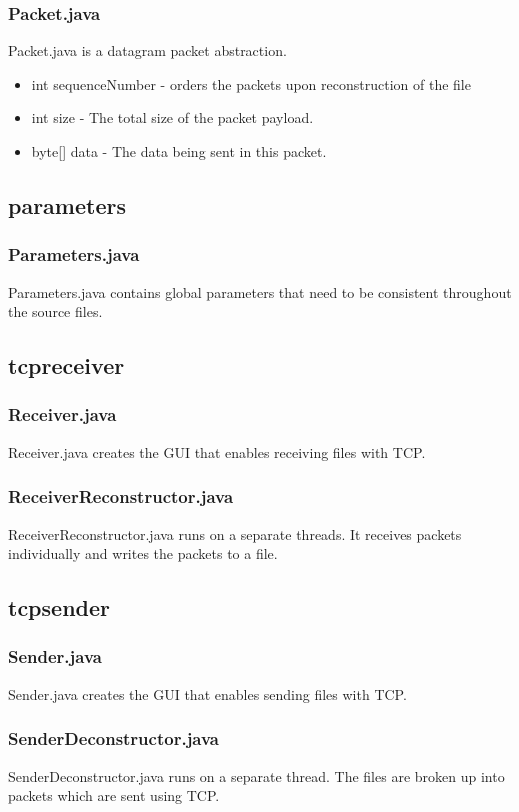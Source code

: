 \documentclass[a4paper,10pt]{article}
\begin{document}
\subsubsection{Packet.java}
Packet.java is a datagram packet abstraction.
\begin{itemize}
	\item int sequenceNumber - orders the packets upon reconstruction of
		the file
	\item int size - The total size of the packet payload.
	\item byte[] data - The data being sent in this packet.
\end{itemize}

\subsection{parameters}
\subsubsection{Parameters.java}
Parameters.java contains global parameters that need to be consistent
throughout the source files.

\subsection{tcpreceiver}
\subsubsection{Receiver.java}
Receiver.java creates the GUI that enables receiving files with TCP.
\subsubsection{ReceiverReconstructor.java}
ReceiverReconstructor.java runs on a separate threads. It receives packets
individually and writes the packets to a file.

\subsection{tcpsender}
\subsubsection{Sender.java}
Sender.java creates the GUI that enables sending files with TCP.
\subsubsection{SenderDeconstructor.java}
SenderDeconstructor.java runs on a separate thread. The files are broken up
into packets which are sent using TCP.
\end{document}
